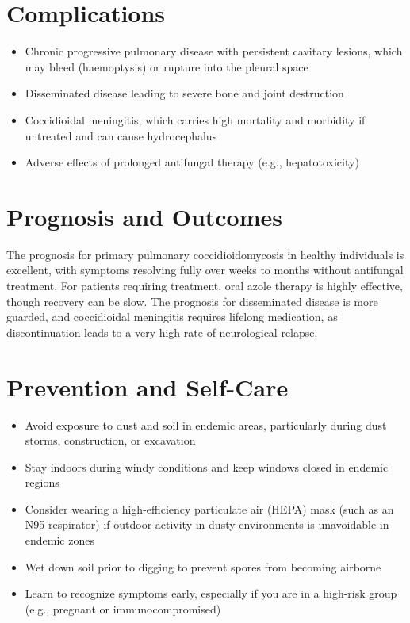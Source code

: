 \section*{Complications}
\begin{itemize}
    \item Chronic progressive pulmonary disease with persistent cavitary lesions, which may bleed (haemoptysis) or rupture into the pleural space
    \item Disseminated disease leading to severe bone and joint destruction
    \item Coccidioidal meningitis, which carries high mortality and morbidity if untreated and can cause hydrocephalus
    \item Adverse effects of prolonged antifungal therapy (e.g., hepatotoxicity)
\end{itemize}

\section*{Prognosis and Outcomes}
The prognosis for primary pulmonary coccidioidomycosis in healthy individuals is excellent, with symptoms resolving fully over weeks to months without antifungal treatment. For patients requiring treatment, oral azole therapy is highly effective, though recovery can be slow. The prognosis for disseminated disease is more guarded, and coccidioidal meningitis requires lifelong medication, as discontinuation leads to a very high rate of neurological relapse.

\section*{Prevention and Self-Care}
\begin{itemize}
    \item Avoid exposure to dust and soil in endemic areas, particularly during dust storms, construction, or excavation
    \item Stay indoors during windy conditions and keep windows closed in endemic regions
    \item Consider wearing a high-efficiency particulate air (HEPA) mask (such as an N95 respirator) if outdoor activity in dusty environments is unavoidable in endemic zones
    \item Wet down soil prior to digging to prevent spores from becoming airborne
    \item Learn to recognize symptoms early, especially if you are in a high-risk group (e.g., pregnant or immunocompromised)
\end{itemize}

